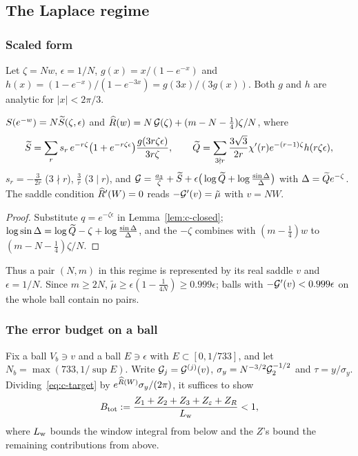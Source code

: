 \subsection{The Laplace regime}\label{sec:c-laplace}

\subsubsection{Scaled form}
Let $\zeta=Nw$, $\epsilon=1/N$, $g(x)=x/(1-e^{-x})$ and $h(x)=(1-e^{-x})/(1-e^{-3x})=g(3x)/(3g(x))$. Both $g$ and $h$ are
analytic for $|x|<2\pi/3$.

\begin{lemma}\label{lem:c-scaled}
$S(e^{-w})=N\widetilde S(\zeta,\epsilon)$ and $\widehat R(w)=N\,\mathcal G(\zeta)+(m-N-\frac14)\zeta/N$, where
\[
\widetilde S=\sum_r s_r\,e^{-r\zeta}\big(1+e^{-r\zeta\epsilon}\big)\frac{g(3r\zeta\epsilon)}{3r\zeta},\qquad
\widetilde Q=\sum_{3\nmid r}\frac{3\sqrt3}{2r}\chi'(r)e^{-(r-1)\zeta}h(r\zeta\epsilon),
\]
$s_r=-\frac3{2r}$ ($3\nmid r$), $\frac3r$ ($3\mid r$), and
$\mathcal G=\frac{a_3}\zeta+\widetilde S+\epsilon\big(\log\widetilde Q+\log\tfrac{\sin\Delta}\Delta\big)$ with $\Delta=\widetilde Q e^{-\zeta}$. The saddle
condition $\widehat R'(W)=0$ reads $-\mathcal G'(v)=\tilde\mu$ with $v=NW$.
\end{lemma}
\begin{proof}
Substitute $q=e^{-\zeta\epsilon}$ in Lemma~\ref{lem:c-closed}; $\log\sin\Delta=\log\widetilde Q-\zeta+\log\frac{\sin\Delta}{\Delta}$,
and the $-\zeta$ combines with $(m-\frac14)w$ to $(m-N-\frac14)\zeta/N$.
\end{proof}

Thus a pair $(N,m)$ in this regime is represented by its real saddle $v$ and $\epsilon=1/N$. Since $m\ge2N$,
$\tilde\mu\ge\epsilon(1-\frac1{4N})\ge0.999\epsilon$; balls with $-\mathcal G'(v)<0.999\epsilon$ on the whole ball contain no pairs.

\subsubsection{The error budget on a ball}
Fix a ball $V_b\ni v$ and a ball $E\ni\epsilon$ with $E\subset[0,1/733]$, and let $N_b=\max(733,1/\sup E)$. Write
$\mathcal G_j=\mathcal G^{(j)}(v)$, $\sigma_y=N^{-3/2}\mathcal G_2^{-1/2}$ and $\tau=y/\sigma_y$. Dividing~\eqref{eq:c-target} by
$e^{\widehat R(W)}\sigma_y/(2\pi)$, it suffices to show
\begin{equation}\label{eq:c-B}
B_{\rm tot}:=\frac{Z_1+Z_2+Z_3+Z_\varepsilon+Z_R}{L_{\rm w}}<1,
\end{equation}
where $L_{\rm w}$ bounds the window integral from below and the $Z$'s bound the remaining contributions from above.

